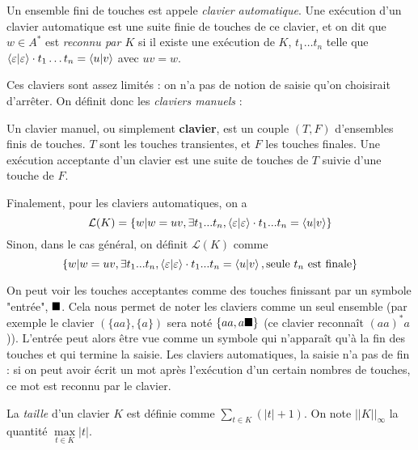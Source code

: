 \documentclass[12pt, a4paper]{article}
\renewcommand{\L}{\mathcal{L}}
\newcommand{\Kinf}{||K||_{\infty}}
\begin{document}
    Un ensemble fini de touches est appele \emph{clavier automatique}. Une exécution d'un clavier automatique est une suite finie de touches de ce clavier, et on dit que $w \in A^*$ est \emph{reconnu par $K$} si il existe une exécution de $K$, $t_1\dots t_n$ telle que $\left\langle \varepsilon \middle| \varepsilon \right\rangle\cdot t_1\dots t_n = \left\langle u \middle| v \right\rangle$ avec $uv = w$.
    
    Ces claviers sont assez limités : on n'a pas de notion de saisie qu'on choisirait d'arrêter. On définit donc les \emph{claviers manuels} :
    \begin{clavier}[Clavier]
        Un clavier manuel, ou simplement \textbf{clavier}, est un couple $(T,F)$ d'ensembles finis de touches. $T$ sont les touches transientes, et $F$ les touches finales.
        Une exécution acceptante d'un clavier est une suite de touches de $T$ suivie d'une touche de $F$.
    \end{clavier}
    
    Finalement, pour les claviers automatiques, on a \[\L(K) = \{w | w =uv, \exists t_1...t_n, \conf{\varepsilon}{\varepsilon}\cdot t_1...t_n = \conf{u}{v}\}\]
    Sinon, dans le cas général, on définit $\L(K)$ comme \[\{w | w =uv, \exists t_1...t_n, \left\langle \varepsilon \middle| \varepsilon \right\rangle\cdot t_1...t_n = \left\langle u \middle| v \right\rangle, \mathrm{seule~} t_n \mathrm{~est~finale}\}\]
    
    \begin{example}[Remarque]
        On peut voir les touches acceptantes comme des touches finissant par un symbole "entrée", $\mathord{\blacksquare}$. Cela nous permet de noter les claviers comme un seul ensemble (par exemple le clavier $(\{aa\},\{a\})$ sera noté $\{aa,a\mathord{\blacksquare}\}$ (ce clavier reconnaît $(aa)^*a$)).   
        L'entrée peut alors être vue comme un symbole qui n'apparaît qu'à la fin des touches et qui termine la saisie. Les claviers automatiques, la saisie n'a pas de fin : si on peut avoir écrit un mot après l'exécution d'un certain nombres de touches, ce mot est reconnu par le clavier.
    \end{example}

    La \emph{taille} d'un clavier $K$ est définie comme $\sum_{t \in K} (|t| + 1)$.
    On note $\Kinf$ la quantité $\max\limits_{t \in K} |t|$.
    
\end{document}
